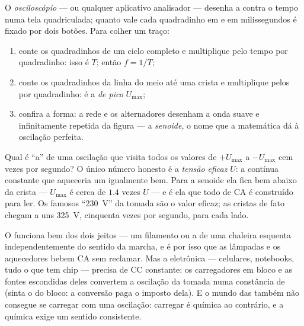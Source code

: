 \begin{method}\label{met:g9:alternating-current:scope}
O \emph{osciloscópio} --- ou qualquer aplicativo
analisador --- desenha a  contra o tempo numa tela quadriculada;
quanto vale cada quadradinho em  e em milissegundos é fixado por
dois botões. Para colher um traço:
\begin{enumerate}
  \item conte os quadradinhos de um ciclo completo e multiplique pelo
        tempo por quadradinho: isso é $T$; então $f = 1/T$;
  \item conte os quadradinhos da linha do meio até uma crista e
        multiplique pelos  por quadradinho: é a \emph{ de
        pico} $U_{\text{max}}$;
  \item confira a forma: a rede e os alternadores desenham a onda
        suave e infinitamente repetida da figura --- a
        \emph{senoide}, o nome que a matemática dá à oscilação
        perfeita.
\end{enumerate}
\end{method}

\begin{proposition}\label{prop:g9:alternating-current:effective}
Qual é ``a''  de uma oscilação que visita todos os valores de
$+U_{\text{max}}$ a $-U_{\text{max}}$ cem vezes por segundo? O único
número honesto é a \emph{tensão eficaz} $U$: a
 contínua constante que aqueceria um  igualmente bem.
Para a senoide ela fica bem abaixo da crista --- $U_{\text{max}}$ é
cerca de $1.4$ vezes $U$ --- e é ela que todo  de CA é
construído para ler. Os famosos ``\qty{230}{V}'' da tomada são o
valor eficaz; as cristas de fato chegam a uns \qty{325}{V}, cinquenta
vezes por segundo, para cada lado.
\end{proposition}

\begin{example}\label{ex:g9:alternating-current:whocares}
O  funciona bem dos dois jeitos --- um filamento ou a
 de uma chaleira esquenta independentemente do sentido da
marcha, e é por isso que as lâmpadas e os aquecedores bebem CA sem
reclamar. Mas a eletrônica --- celulares, notebooks, tudo o que tem
chip --- precisa de CC constante: os carregadores em bloco e as
fontes escondidas deles convertem a oscilação da tomada numa
constância de  (sinta o  do bloco: a conversão paga o
imposto dela). E o mundo das  também não consegue se carregar
com uma oscilação: carregar é química ao contrário, e a química exige
um sentido consistente.
\end{example}

